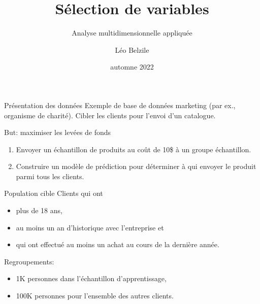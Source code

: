 \documentclass[
  ignorenonframetext,
]{beamer}
\title{Sélection de variables}
\subtitle{Analyse multidimensionnelle appliquée}
\author{Léo Belzile}
\date{automne 2022}
\institute{HEC Montréal}
\providecommand{\tightlist}{%
  \setlength{\itemsep}{0pt}\setlength{\parskip}{0pt}}\usepackage{longtable,booktabs,array}
\begin{document}
\frame{\titlepage}
\ifdefined\Shaded\renewenvironment{Shaded}{\begin{tcolorbox}[sharp corners, borderline west={3pt}{0pt}{shadecolor}, boxrule=0pt, frame hidden, enhanced, interior hidden, breakable]}{\end{tcolorbox}}\fi

\begin{frame}{Présentation des données}
\protect\hypertarget{pruxe9sentation-des-donnuxe9es}{}
Exemple de base de données marketing (par ex., organisme de charité).
Cibler les clients pour l'envoi d'un catalogue.

But: maximiser les levées de fonds

\begin{enumerate}
\tightlist
\item
  Envoyer un échantillon de produits au coût de 10\$ à un groupe
  échantillon.
\item
  Construire un modèle de prédiction pour déterminer à qui envoyer le
  produit parmi tous les clients.
\end{enumerate}
\end{frame}

\begin{frame}{Population cible}
\protect\hypertarget{population-cible}{}
Clients qui ont

\begin{itemize}
\tightlist
\item
  plus de 18 ans,
\item
  au moins un an d'historique avec l'entreprise et
\item
  qui ont effectué au moins un achat au cours de la dernière année.
\end{itemize}

Regroupements:

\begin{itemize}
\tightlist
\item
  1K personnes dans l'échantillon d'apprentissage,
\item
  100K personnes pour l'ensemble des autres clients.
\end{itemize}
\end{frame}
\end{document}
